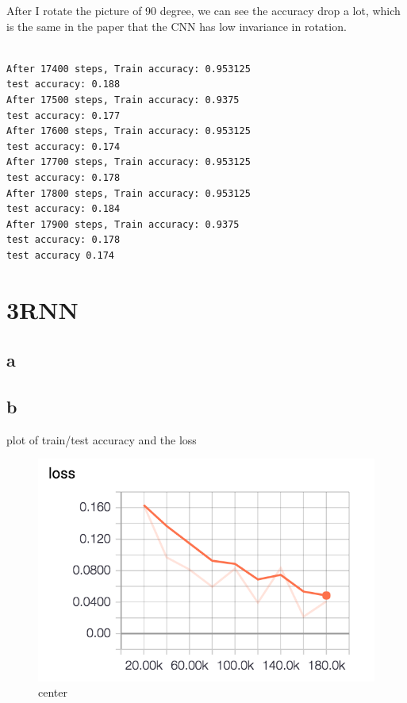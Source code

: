 \documentclass[12pt]{article}
\begin{document}
After I rotate the picture of 90 degree, we can see the accuracy drop a lot, which is the same in the paper that the CNN has low invariance in rotation. 
\begin{lstlisting}

After 17400 steps, Train accuracy: 0.953125
test accuracy: 0.188
After 17500 steps, Train accuracy: 0.9375
test accuracy: 0.177
After 17600 steps, Train accuracy: 0.953125
test accuracy: 0.174
After 17700 steps, Train accuracy: 0.953125
test accuracy: 0.178
After 17800 steps, Train accuracy: 0.953125
test accuracy: 0.184
After 17900 steps, Train accuracy: 0.9375
test accuracy: 0.178
test accuracy 0.174
\end{lstlisting}








\section{3RNN}
\subsection{a}

\subsection{b}

plot of train/test accuracy and the loss
\begin{figure}[H]
  \caption{center}
  \centering
    \includegraphics[scale=1]{3los.png}
\end{figure}
\end{document}
